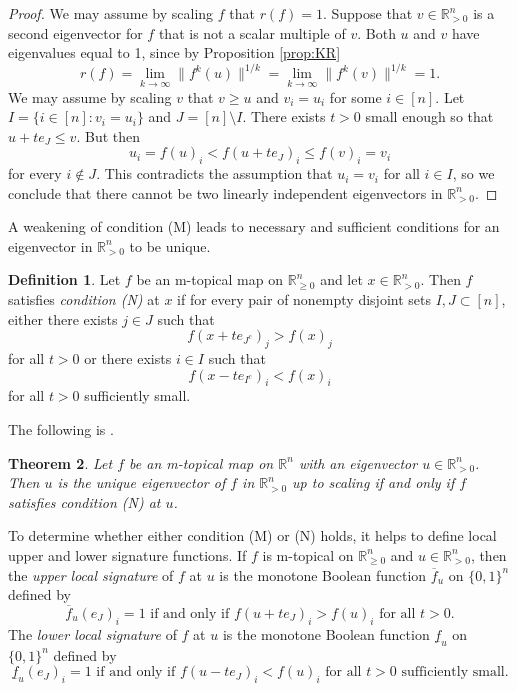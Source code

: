 \documentclass[10pt,reqno]{amsart}
\newcommand{\R}{\mathbb{R}}
\newcommand{\bs}{\setminus}
\theoremstyle{plain}
\newtheorem{theorem}{Theorem}[section]
\theoremstyle{definition}
\newtheorem{definition}[theorem]{Definition}
\numberwithin{equation}{section}
\begin{document}
\begin{proof}
We may assume by scaling $f$ that $r(f) = 1$. Suppose that $v \in \R^n_{>0}$ is a second eigenvector for $f$ that is not a scalar multiple of $v$. Both $u$ and $v$ have eigenvalues equal to 1, since by Proposition \ref{prop:KR}
$$r(f) = \lim_{k \rightarrow \infty} \|f^k(u)\|^{1/k} = \lim_{k \rightarrow \infty} \|f^k(v)\|^{1/k} = 1.$$ 
We may assume by scaling $v$ that $v \ge u$ and $v_i = u_i$ for some $i \in [n]$. Let $I = \{i \in [n] : v_i = u_i \}$ and $J = [n] \bs I$. There exists $t > 0$ small enough so that $u + te_J \le v.$ 
But then 
$$u_i = f(u)_i < f(u + te_J)_i \le f(v)_i = v_i$$
for every $i \notin J$. This contradicts the assumption that $u_i = v_i$ for all $i \in I$, so we conclude that there cannot be two linearly independent eigenvectors in $\R^n_{>0}$. 
\end{proof}

A weakening of condition (M) leads to necessary and sufficient conditions for an eigenvector in $\R^n_{>0}$ to be unique.

\begin{definition}
Let $f$ be an m-topical map on $\R^n_{\ge 0}$ and let $x \in \R^n_{>0}$.  Then $f$ satisfies \emph{condition (N)} at $x$ if for every pair of nonempty disjoint sets $I, J \subset [n]$, either there exists $j \in J$ such that
$$f(x+t e_{J^c})_j > f(x)_j$$
for all $t > 0$ or there exists $i \in I$ such that
$$f(x-t e_{I^c})_i < f(x)_i$$ 
for all $t > 0$ sufficiently small.
\end{definition}

The following is \cite[Theorem 4.8]{AkianGaubertHochart20}.
\begin{theorem} \label{thm:condN}
Let $f$ be an m-topical map on $\R^n$ with an eigenvector $u \in \R^n_{>0}$.  Then $u$ is the unique eigenvector of $f$ in $\R^n_{>0}$ up to scaling if and only if $f$ satisfies condition (N) at $u$. 
\end{theorem}

To determine whether either condition (M) or (N) holds, it helps to define local upper and lower signature functions.  If $f$ is m-topical on $\R^n_{\ge 0}$ and $u \in \R^n_{>0}$, then the \emph{upper local signature} of $f$ at $u$ is the monotone Boolean function $\overline{f}_u$ on $\{0,1\}^n$ defined by
$$\overline{f}_u(e_J)_i = 1 \text{ if and only if } f(u + te_J)_i > f(u)_i \text{ for all } t > 0.$$  
The \emph{lower local signature} of $f$ at $u$ is the monotone Boolean function $\underline{f}_u$ on $\{0,1\}^n$ defined by
$$\underline{f}_u(e_J)_i = 1 \text{ if and only if } f(u - te_J)_i < f(u)_i \text{ for all } t > 0 \text{ sufficiently small}.$$  
\end{document}
